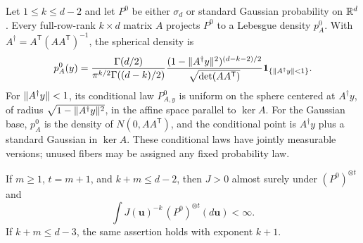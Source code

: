\begin{lemma}
\label{lem:projection-fibers}
Let $1\le k\le d-2$ and let $P^0$ be either $\sigma_d$ or standard
Gaussian probability on $\mathbb R^d$. Every full-row-rank $k\times d$ matrix
$A$ projects $P^0$ to a Lebesgue density $p_A^0$. With
$A^\dagger=A^{\mathsf T}(AA^{\mathsf T})^{-1}$, the spherical density is
\begin{equation}\label{eq:spherical-projection-density}
 p_A^0(y)=\frac{\Gamma(d/2)}{\pi^{k/2}\Gamma((d-k)/2)}
 \frac{(1-\lVert A^\dagger y\rVert^2)^{(d-k-2)/2}}
      {\sqrt{\det(AA^{\mathsf T})}}
 \mathbf 1_{\{\lVert A^\dagger y\rVert<1\}}.
\end{equation}
For $\lVert A^\dagger y\rVert<1$, its conditional law $P^0_{A,y}$ is uniform
on the sphere centered at $A^\dagger y$, of radius
$\sqrt{1-\lVert A^\dagger y\rVert^2}$, in the affine space parallel to $\ker A$.
For the Gaussian base, $p_A^0$ is the density of $N(0,AA^{\mathsf T})$,
and the conditional point is $A^\dagger y$ plus a standard Gaussian in
$\ker A$. These conditional laws have jointly measurable versions;
unused fibers may be assigned any fixed probability law.

If $m\ge1$, $t=m+1$, and $k+m\le d-2$, then $J>0$ almost surely under
$(P^0)^{\otimes t}$ and
\begin{equation}\label{eq:inverse-affine-volume}
 \int J(\mathbf u)^{-k}\,(P^0)^{\otimes t}(d\mathbf u)<\infty.
\end{equation}
If $k+m\le d-3$, the same assertion holds with exponent $k+1$.
\end{lemma}


